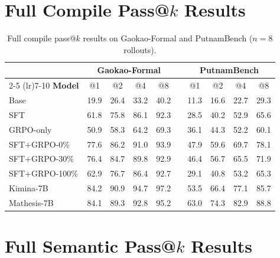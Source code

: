 \documentclass[11pt,a4paper]{article}
\begin{document}
\section{Full Compile Pass@\texorpdfstring{$k$}{k} Results}\label{app:full_passk}

\begin{table}[H]
\centering
\small
\caption{Full compile pass@$k$ results on Gaokao-Formal and PutnamBench ($n{=}8$ rollouts).}
\label{tab:full_passk}
\begin{tabular}{@{}l cccc c cccc@{}}
\toprule
& \multicolumn{4}{c}{\textbf{Gaokao-Formal}} && \multicolumn{4}{c}{\textbf{PutnamBench}} \\
\cmidrule(lr){2-5} \cmidrule(lr){7-10}
\textbf{Model} & @1 & @2 & @4 & @8 && @1 & @2 & @4 & @8 \\
\midrule
Base & 19.9 & 26.4 & 33.2 & 40.2 && 11.3 & 16.6 & 22.7 & 29.3 \\
SFT & 61.8 & 75.8 & 86.1 & 92.3 && 28.5 & 40.2 & 52.9 & 65.6 \\
GRPO-only & 50.9 & 58.3 & 64.2 & 69.3 && 36.1 & 44.3 & 52.2 & 60.1 \\
\addlinespace[2pt]
SFT+GRPO-0\% & 77.6 & 86.2 & 91.0 & 93.9 && 47.9 & 59.6 & 69.7 & 78.1 \\
SFT+GRPO-30\% & 76.4 & 84.7 & 89.8 & 92.9 && 46.4 & 56.7 & 65.5 & 71.9 \\
SFT+GRPO-100\% & 62.9 & 76.7 & 86.4 & 92.7 && 29.1 & 40.8 & 53.2 & 65.3 \\
\addlinespace[2pt]
Kimina-7B & 84.2 & 90.9 & 94.7 & 97.2 && 53.5 & 66.4 & 77.1 & 85.7 \\
Mathesis-7B & 84.1 & 89.3 & 92.8 & 95.2 && 63.0 & 74.3 & 82.9 & 88.8 \\
\bottomrule
\end{tabular}
\end{table}


\section{Full Semantic Pass@\texorpdfstring{$k$}{k} Results}\label{app:full_semantic}
\end{document}
